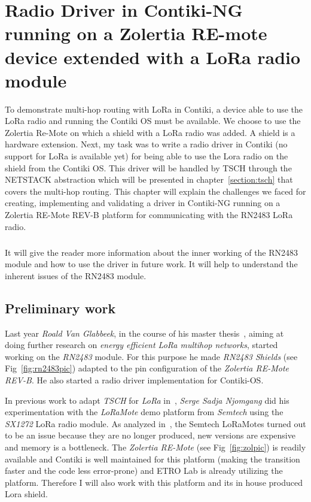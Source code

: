\chapter{Radio Driver in Contiki-NG running on a Zolertia RE-mote device extended with a LoRa radio module\label{section:radio}}

To demonstrate multi-hop routing with LoRa in Contiki, a device able to use
the LoRa radio and running the Contiki OS must be available.
We choose to use the Zolertia Re-Mote on which a shield with a LoRa radio was
added. A shield is a hardware extension.
Next, my task was to write a radio driver in Contiki (no support for LoRa is available yet)
for being able to use the Lora radio on the shield from the Contiki OS.
This driver will be handled by TSCH through the NETSTACK abstraction
which will be presented in chapter~\ref{section:tsch} that covers the multi-hop routing.
This chapter will explain the challenges we faced for creating, implementing
and validating a driver in Contiki-NG running on a Zolertia RE-Mote REV-B
platform for communicating with the RN2483 LoRa radio.

\paragraph{}

It will give the reader more information about the inner working of
the RN2483 module and how to use the driver in future work.
It will help to understand the inherent issues of the RN2483 module.

\section{Preliminary work}

Last year \emph{Roald Van Glabbeek}, in the course of his master thesis~\cite{8847137},
aiming at doing further research on \emph{energy efficient LoRa multihop networks},
started working on the \emph{RN2483} module.
For this purpose he made \emph{RN2483 Shields} (see Fig~\ref{fig:rn2483pic}) adapted to the pin
configuration of the \emph{Zolertia RE-Mote REV-B}. He also started a radio driver
implementation for Contiki-OS\@.

In previous work to adapt \emph{TSCH} for \emph{LoRa}
in~\cite{njomgang_2018}, \emph{Serge Sadja Njomgang} did his experimentation with
the \emph{LoRaMote} demo platform from \emph{Semtech} using the \emph{SX1272} LoRa
radio module.
As analyzed in~\cite{8847137}, the Semtech LoRaMotes turned out to be an issue
because they are no longer produced, new versions are expensive and memory is
a bottleneck.
The \emph{Zolertia RE-Mote} (see Fig~\ref{fig:zolpic}) is readily available and
Contiki is well maintained for this platform (making the transition faster and
the code less error-prone) and ETRO Lab is already utilizing the platform.
Therefore I will also work with this platform and its in house produced Lora shield.

